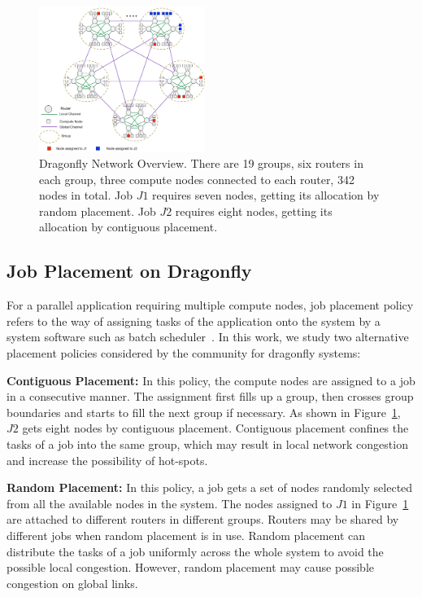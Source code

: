 \documentclass[conference,compsoc]{IEEEtran}
\begin{document}
\begin{figure}[h!] 
  \centering
  \includegraphics[width=0.48\textwidth]{dragonfly-overview}
  \caption{Dragonfly Network Overview. There are 19 groups, six routers in each group, three compute nodes connected to each router, 342 nodes in total. Job $J1$ requires seven nodes, getting its allocation by random placement. Job $J2$ requires eight nodes, getting its allocation by contiguous placement.}
  \label{fig:dragonfly-overview}
\end{figure}


\subsection{Job Placement on Dragonfly}
\label{sec:placement-schemes}

For a parallel application requiring multiple compute nodes, job placement policy refers to the way of assigning tasks of the application onto the system by a system software such as batch scheduler~\cite{xu-cluster14}. In this work, we study two alternative placement policies considered by the community for dragonfly systems: 


\textbf{Contiguous Placement:} In this policy, the compute nodes are assigned to a job in a consecutive manner. The assignment first fills up a group, then crosses group boundaries and starts to fill the next group if necessary. As shown in Figure~\ref{fig:dragonfly-overview}, $J2$ gets eight nodes by contiguous placement. Contiguous placement confines the tasks of a job into the same group, which may result in local network congestion and increase the possibility of hot-spots. 

\textbf{Random Placement:} In this policy, a job gets a set of nodes randomly selected from all the available nodes in the system. The nodes assigned to $J1$ in Figure~\ref{fig:dragonfly-overview} are attached to different routers in different groups. Routers may be shared by different jobs when random placement is in use. Random placement can distribute the tasks of a job uniformly across the whole system to avoid the possible local congestion. However, random placement may cause possible congestion on global links.
\end{document}
